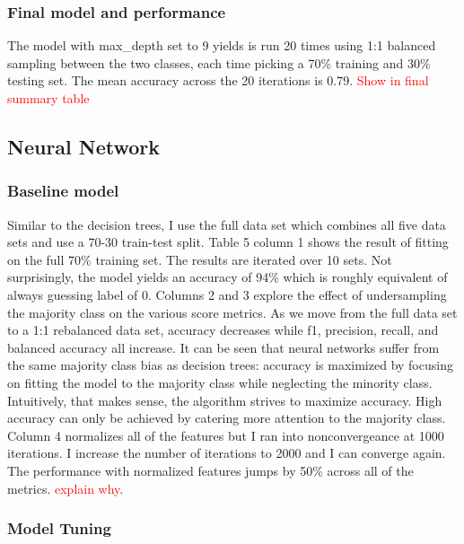 \documentclass{article}
\newcommand\todo[1]{\textcolor{red}{#1}}
\begin{document}
\subsubsection*{Final model and performance}

The model with max\_depth set to 9 yields is run 20 times using 1:1 balanced sampling between the two classes, each time picking a 70\% training and 30\% testing set. The mean accuracy across the 20 iterations is 0.79. \todo{Show in final summary table}

\subsection{Neural Network}

\subsubsection*{Baseline model}

Similar to the decision trees, I use the full data set which combines all five data sets and use a 70-30 train-test split. Table 5 column 1 shows the result of fitting on the full 70\% training set. The results are iterated over 10 sets. Not surprisingly, the model yields an accuracy of 94\% which is roughly equivalent of always guessing label of 0. Columns 2 and 3 explore the effect of undersampling the majority class on the various score metrics. As we move from the full data set to a 1:1 rebalanced data set, accuracy decreases while f1, precision, recall, and balanced accuracy all increase. It can be seen that neural networks suffer from the same majority class bias as decision trees: accuracy is maximized by focusing on fitting the model to the majority class while neglecting the minority class. Intuitively, that makes sense, the algorithm strives to maximize accuracy. High accuracy can only be achieved by catering more attention to the majority class. Column 4 normalizes all of the features but I ran into nonconvergeance at 1000 iterations. I increase the number of iterations to 2000 and I can converge again. The performance with normalized features jumps by 50\% across all of the metrics. \todo{explain why}. 

\subsubsection*{Model Tuning}
\end{document}

